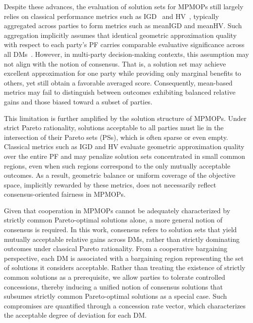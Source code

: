 \documentclass[journal]{IEEEtran}
\begin{document}
Despite these advances, the evaluation of solution sets for MPMOPs still largely relies on classical performance metrics such as IGD~\cite{zhang2008multiobjective} and HV~\cite{zhang2007moea}, typically aggregated across parties to form metrics such as meanIGD and meanHV. Such aggregation implicitly assumes that identical geometric approximation quality with respect to each party’s PF carries comparable evaluative significance across all DMs~\cite{KARSU2015343,ogryczak2014fair,yu2025towards}. However, in multi-party decision-making contexts, this assumption may not align with the notion of consensus. That is, a solution set may achieve excellent approximation for one party while providing only marginal benefits to others, yet still obtain a favorable averaged score. Consequently, mean-based metrics may fail to distinguish between outcomes exhibiting balanced relative gains and those biased toward a subset of parties.

This limitation is further amplified by the solution structure of MPMOPs. Under strict Pareto rationality, solutions acceptable to all parties must lie in the intersection of their Pareto sets (PSs), which is often sparse or even empty. Classical metrics such as IGD and HV evaluate geometric approximation quality over the entire PF and may penalize solution sets concentrated in small common regions, even when such regions correspond to the only mutually acceptable outcomes. As a result, geometric balance or uniform coverage of the objective space, implicitly rewarded by these metrics, does not necessarily reflect consensus-oriented fairness in MPMOPs.

Given that cooperation in MPMOPs cannot be adequately characterized by strictly common Pareto-optimal solutions alone, a more general notion of consensus is required. In this work, consensus refers to solution sets that yield mutually acceptable relative gains across DMs, rather than strictly dominating outcomes under classical Pareto rationality. From a cooperative bargaining perspective, each DM is associated with a bargaining region representing the set of solutions it considers acceptable. Rather than treating the existence of strictly common solutions as a prerequisite, we allow parties to tolerate controlled concessions, thereby inducing a unified notion of consensus solutions that subsumes strictly common Pareto-optimal solutions as a special case. Such compromises are quantified through a concession rate vector, which characterizes the acceptable degree of deviation for each DM.
\end{document}
